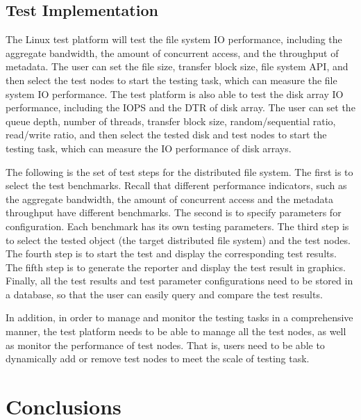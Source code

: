 \documentclass[11pt]{article}
\begin{document}
\subsection{Test Implementation}
The Linux test platform will test the file system IO performance, 
including the aggregate bandwidth, the amount of concurrent access, 
and the throughput of metadata. The user can set the file size, 
transfer block size, file system API, and then select the test nodes 
to start the testing task, which can measure the file system IO 
performance. The test platform is also able to test the disk array 
IO performance, including the IOPS and the DTR of disk array. The user 
can set the queue depth, number of threads, transfer block size, 
random/sequential ratio, read/write ratio, and then select the tested 
disk and test nodes to start the testing task, which can measure the 
IO performance of disk arrays.

The following is the set of test steps for the distributed file system.
The first is to select the test benchmarks. Recall that different 
performance indicators, such as the aggregate bandwidth, the amount of 
concurrent access and the metadata throughput have different benchmarks. 
The second is to specify parameters for configuration. Each benchmark 
has its own testing parameters. The third step is to select the tested 
object (the target distributed file system) and the test nodes. The 
fourth step is to start the test and display the corresponding test 
results. The fifth step is to generate the reporter and display the 
test result in graphics. Finally, all the test results and test 
parameter configurations need to be stored in a database, so that the
user can easily query and compare the test results.

In addition, in order to manage and monitor the testing tasks in a 
comprehensive manner, the test platform needs to be able to manage 
all the test nodes, as well as monitor the performance of test nodes. 
That is, users need to be able to dynamically add or remove test 
nodes to meet the scale of testing task. 

\section{Conclusions}


\nocite{*}

\end{document}
